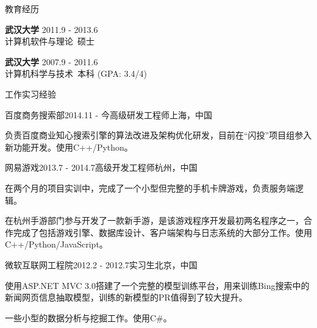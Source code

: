 \documentclass{resume} %
\begin{document}
\begin{rSection}{教育经历}

{\bf 武汉大学} \hfill {2011.9 - 2013.6} \\
计算机软件与理论\ 硕士

{\bf 武汉大学} \hfill {2007.9 - 2011.6} \\
计算机科学与技术\ 本科 (GPA: 3.4/4)
\vspace{0.5em}

\end{rSection}

\begin{rSection}{工作实习经验}

\begin{rSubsection}{百度商务搜索部}{2014.11 - 今}{高级研发工程师}{上海，中国}
\item 负责百度商业知心搜索引擎的算法改进及架构优化研发，目前在“闪投”项目组参入新功能开发。使用C++/Python。
\end{rSubsection}
\begin{rSubsection}{网易游戏}{2013.7 - 2014.7}{高级开发工程师}{杭州，中国}
\item 在两个月的项目实训中，完成了一个小型但完整的手机卡牌游戏，负责服务端逻辑。
\item 在杭州手游部门参与开发了一款新手游，是该游戏程序开发最初两名程序之一，合作完成了包括游戏引擎、数据库设计、客户端架构与日志系统的大部分工作。使用C++/Python/JavaScript。
\end{rSubsection}
\begin{rSubsection}{微软互联网工程院}{2012.2 - 2012.7}{实习生}{北京，中国}
\item 使用ASP.NET MVC 3.0搭建了一个完整的模型训练平台，用来训练Bing搜索中的新闻网页信息抽取模型，训练的新模型的PR值得到了较大提升。
\item 一些小型的数据分析与挖掘工作。使用C\#。
\end{rSubsection}

\end{rSection}
\end{document}
